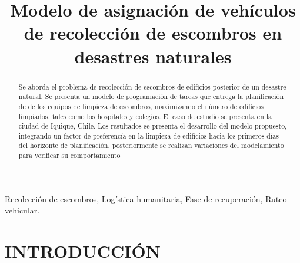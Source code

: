 \documentclass[letterpaper,conference]{IEEEtran}
\begin{document}
\title{Modelo de asignación de vehículos de recolección de escombros en desastres naturales}

\author{
\and
{}
}

\maketitle

\thispagestyle{plain}
\pagestyle{plain}

\begin{abstract}
Se aborda el problema de recolección de escombros de edificios posterior de un desastre natural. Se presenta un modelo de programación de tareas que entrega la planificación de de los equipos de limpieza de escombros, maximizando el número de edificios limpiados, tales como los hospitales y colegios. El caso de estudio se presenta en la ciudad de Iquique, Chile. Los resultados se presenta el desarrollo del modelo propuesto, integrando un factor de preferencía en la limpieza de edificios hacia los primeros días del horizonte de planificación, posteriormente se realizan variaciones del modelamiento para verificar su comportamiento\\ 
\end{abstract}
\begin{IEEEkeywords}
Recolección de escombros, Logística humanitaria, Fase de recuperación, Ruteo vehicular.
\end{IEEEkeywords}

\IEEEpeerreviewmaketitle

\section{INTRODUCCIÓN}
\end{document}
